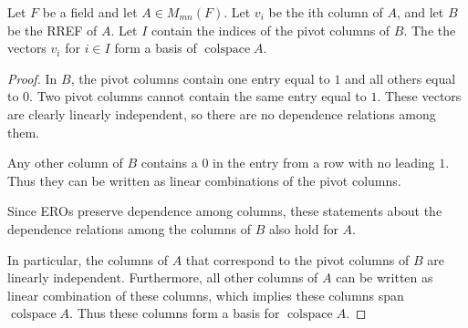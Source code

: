 \documentclass{article}
\DeclareMathOperator{\colspace}{colspace}
\begin{document}
  \begin{cthm}
    Let $F$ be a field and let $A \in M_{mn}(F)$. Let $v_i$ be the ith column of $A$, and let $B$ be the RREF of $A$. Let $I$ contain the indices of the pivot columns of $B$. The the vectors $v_i$ for $i \in I$ form a basis of $\colspace A$.
  \end{cthm}
  \begin{proof}
    In $B$, the pivot columns contain one entry equal to $1$ and all others equal to $0$. Two pivot columns cannot contain the same entry equal to $1$. These vectors are clearly linearly independent, so there are no dependence relations among them.

    Any other column of $B$ contains a $0$ in the entry from a row with no leading $1$. Thus they can be written as linear combinations of the pivot columns.

    Since EROs preserve dependence among columns, these statements about the dependence relations among the columns of $B$ also hold for $A$.

    In particular, the columns of $A$ that correspond to the pivot columns of $B$ are linearly independent. Furthermore, all other columns of $A$ can be written as linear combination of these columns, which implies these columns span $\colspace A$. Thus these columns form a basis for $\colspace A$.
  \end{proof}
\end{document}
